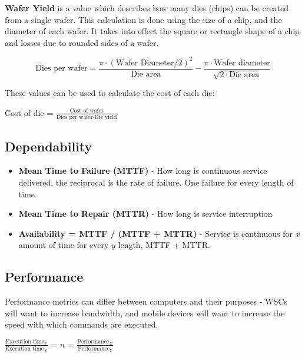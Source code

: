 \documentclass[11pt]{article}
\begin{document}
\textbf{Wafer Yield} is a value which describes how many dies (chips) can be created from a single wafer. This calculation is done using the size of a chip, and the diameter of each wafer. It takes into effect the square or rectangle shape of a chip and losses due to rounded sides of a wafer.

\begin{center}
\begin{equation} \text{Dies per wafer} = 
    \frac{\pi \cdot (\text{Wafer Diameter}/2)^2}{\text{Die area}} - \frac{\pi \cdot \text{Wafer diameter}}{\sqrt{2 \cdot \text{Die area}}}    
\end{equation}
\end{center}

These values can be used to calculate the cost of each die:

\begin{center}
    Cost of die = $\frac{\text{Cost of wafer}}{\text{Dies per wafer}\cdot\text{Die yield}}$
\end{center}

\subsection{Dependability}

\begin{itemize}
    \item \textbf{Mean Time to Failure (MTTF)} - How long is continuous service delivered, the reciprocal is the rate of failure. One failure for every length of time.
    \item \textbf{Mean Time to Repair (MTTR)} - How long is service interruption
    \item\textbf{Availability = MTTF / (MTTF + MTTR)} - Service is continuous for $x$ amount of time for every $y$ length, MTTF + MTTR.
\end{itemize}

\subsection{Performance}

Performance metrics can differ between computers and their purposes - WSCs will want to increase bandwidth, and mobile devices will want to increase the speed with which commands are executed. 

\begin{center}
    $\frac{\text{Execution time}_Y}{\text{Execution time}_X}$ = $n$ = $\frac{\text{Performance}_X}{\text{Performance}_Y}$
\end{center}
\end{document}
